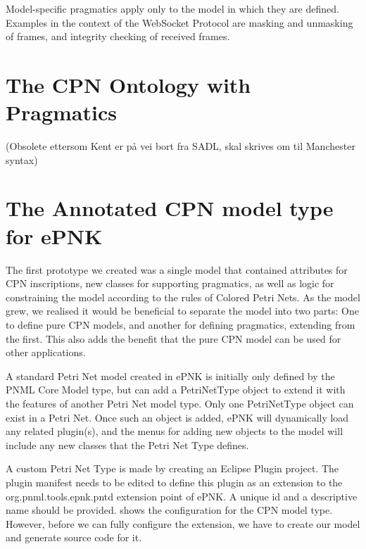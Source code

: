 Model-specific pragmatics apply only to the model in which they are defined.
Examples in the context of the WebSocket Protocol are masking and unmasking of
frames, and integrity checking of received frames.

\section{The CPN Ontology with Pragmatics}
(Obsolete ettersom Kent er på vei bort fra SADL, skal skrives om til Manchester
syntax)

\section{The Annotated CPN model type for ePNK}

The first prototype we created was a single model that contained
attributes for CPN inscriptions, new classes for supporting pragmatics, as
well as logic for constraining the model according to the rules of Colored Petri
Nets. As the model grew, we realised it would be beneficial to separate the
model into two parts: One to define pure CPN models, and another for defining
pragmatics, extending from the first. This also adds the benefit that the pure
CPN model can be used for other applications.


A standard Petri Net model created in ePNK is initially
only defined by the PNML Core Model type, but can add a PetriNetType object to
extend it with the features of another Petri Net model type. Only one PetriNetType
object can exist in a Petri Net. Once such an object is added, ePNK will
dynamically load any related plugin(s), and the menus for adding new objects to
the model will include any new classes that the Petri Net Type defines.

A custom Petri Net Type is made by creating an Eclipse Plugin project.
The plugin manifest needs to be edited to define this plugin as an
extension to the org.pnml.tools.epnk.pntd extension point of ePNK. A unique id
and a descriptive name should be provided.  shows the
configuration for the CPN model type. However, before we can fully configure the
extension, we have to create our model and generate source code for it.

